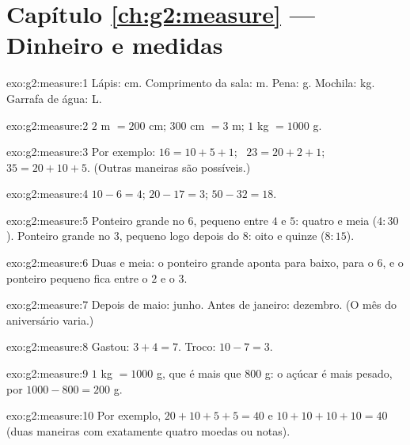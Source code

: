 \section*{Capítulo \ref{ch:g2:measure} --- Dinheiro e medidas}

\begin{solution}{exo:g2:measure:1}
Lápis: cm. Comprimento da sala: m. Pena: g. Mochila: kg. Garrafa de
água: L.
\end{solution}

\begin{solution}{exo:g2:measure:2}
$2$ m $= 200$ cm; \quad $300$ cm $= 3$ m; \quad $1$ kg $= 1000$ g.
\end{solution}

\begin{solution}{exo:g2:measure:3}
Por exemplo: $16 = 10 + 5 + 1$; \ $23 = 20 + 2 + 1$; \
$35 = 20 + 10 + 5$. (Outras maneiras são possíveis.)
\end{solution}

\begin{solution}{exo:g2:measure:4}
$10 - 6 = 4$; \quad $20 - 17 = 3$; \quad $50 - 32 = 18$.
\end{solution}

\begin{solution}{exo:g2:measure:5}
Ponteiro grande no $6$, pequeno entre $4$ e $5$: quatro e meia
($4{:}30$). Ponteiro grande no $3$, pequeno logo depois do $8$: oito
e quinze ($8{:}15$).
\end{solution}

\begin{solution}{exo:g2:measure:6}
Duas e meia: o ponteiro grande aponta para baixo, para o $6$, e o
ponteiro pequeno fica entre o $2$ e o $3$.
\end{solution}

\begin{solution}{exo:g2:measure:7}
Depois de maio: junho. Antes de janeiro: dezembro. (O mês do
aniversário varia.)
\end{solution}

\begin{solution}{exo:g2:measure:8}
Gastou: $3 + 4 = 7$. Troco: $10 - 7 = 3$.
\end{solution}

\begin{solution}{exo:g2:measure:9}
$1$ kg $= 1000$ g, que é mais que $800$ g: o açúcar é mais pesado,
por $1000 - 800 = 200$ g.
\end{solution}

\begin{solution}{exo:g2:measure:10}
Por exemplo, $20 + 10 + 5 + 5 = 40$ e $10 + 10 + 10 + 10 = 40$
(duas maneiras com exatamente quatro moedas ou notas).
\end{solution}
